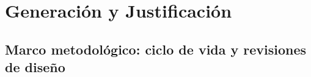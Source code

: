 \section{Generación y Justificación}

\subsection{Marco metodológico: ciclo de vida y revisiones de diseño}
%
%
%

